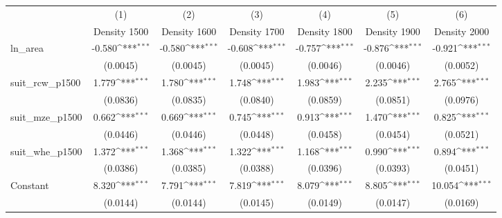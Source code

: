 {
\def\sym#1{\ifmmode^{#1}\else\(^{#1}\)\fi}
\begin{tabular}{l*{6}{c}}
\toprule
                    &\multicolumn{1}{c}{(1)}&\multicolumn{1}{c}{(2)}&\multicolumn{1}{c}{(3)}&\multicolumn{1}{c}{(4)}&\multicolumn{1}{c}{(5)}&\multicolumn{1}{c}{(6)}\\
                    &\multicolumn{1}{c}{Density 1500}&\multicolumn{1}{c}{Density 1600}&\multicolumn{1}{c}{Density 1700}&\multicolumn{1}{c}{Density 1800}&\multicolumn{1}{c}{Density 1900}&\multicolumn{1}{c}{Density 2000}\\
\midrule
ln\_area             &      -0.580\sym{***}&      -0.580\sym{***}&      -0.608\sym{***}&      -0.757\sym{***}&      -0.876\sym{***}&      -0.921\sym{***}\\
                    &    (0.0045)         &    (0.0045)         &    (0.0045)         &    (0.0046)         &    (0.0046)         &    (0.0052)         \\
\addlinespace
suit\_rcw\_p1500      &       1.779\sym{***}&       1.780\sym{***}&       1.748\sym{***}&       1.983\sym{***}&       2.235\sym{***}&       2.765\sym{***}\\
                    &    (0.0836)         &    (0.0835)         &    (0.0840)         &    (0.0859)         &    (0.0851)         &    (0.0976)         \\
\addlinespace
suit\_mze\_p1500      &       0.662\sym{***}&       0.669\sym{***}&       0.745\sym{***}&       0.913\sym{***}&       1.470\sym{***}&       0.825\sym{***}\\
                    &    (0.0446)         &    (0.0446)         &    (0.0448)         &    (0.0458)         &    (0.0454)         &    (0.0521)         \\
\addlinespace
suit\_whe\_p1500      &       1.372\sym{***}&       1.368\sym{***}&       1.322\sym{***}&       1.168\sym{***}&       0.990\sym{***}&       0.894\sym{***}\\
                    &    (0.0386)         &    (0.0385)         &    (0.0388)         &    (0.0396)         &    (0.0393)         &    (0.0451)         \\
\addlinespace
Constant            &       8.320\sym{***}&       7.791\sym{***}&       7.819\sym{***}&       8.079\sym{***}&       8.805\sym{***}&      10.054\sym{***}\\
                    &    (0.0144)         &    (0.0144)         &    (0.0145)         &    (0.0149)         &    (0.0147)         &    (0.0169)         \\

\end{tabular}}
